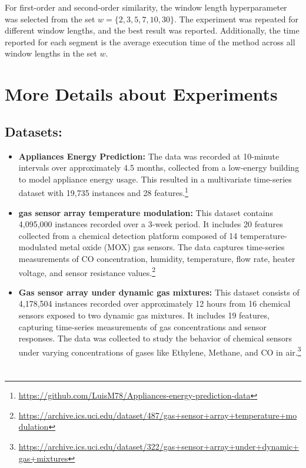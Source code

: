 \documentclass[twoside,11pt]{article}
\begin{document}
For first-order and second-order similarity, the window length hyperparameter was selected from the set \( w = \{2, 3, 5, 7, 10, 30\} \). The experiment was repeated for different window lengths, and the best result was reported. Additionally, the time reported for each segment is the average execution time of the method across all window lengths in the set \( w \).

\newpage

\appendix

\section{More Details about Experiments}
\subsection{Datasets:}
\begin{itemize}
	\item \textbf{Appliances Energy Prediction:} The data was recorded at 10-minute intervals over approximately 4.5 months, collected from a low-energy building to model appliance energy usage. This resulted in a multivariate time-series dataset with 19,735 instances and 28 features.\footnote{\url{https://github.com/LuisM78/Appliances-energy-prediction-data}}
\end{itemize}
\begin{itemize}
	\item \textbf{gas sensor array temperature modulation:} This dataset contains 4,095,000 instances recorded over a 3-week period. It includes 20 features collected from a chemical detection platform composed of 14 temperature-modulated metal oxide (MOX) gas sensors. The data captures time-series measurements of CO concentration, humidity, temperature, flow rate, heater voltage, and sensor resistance values.\footnote{\url{https://archive.ics.uci.edu/dataset/487/gas+sensor+array+temperature+modulation}}
	
\end{itemize}
\begin{itemize}
	\item \textbf{Gas sensor array under dynamic gas mixtures:} This dataset consists of 4,178,504 instances recorded over approximately 12 hours from 16 chemical sensors exposed to two dynamic gas mixtures. It includes 19 features, capturing time-series measurements of gas concentrations and sensor responses. The data was collected to study the behavior of chemical sensors under varying concentrations of gases like Ethylene, Methane, and CO in air.\footnote{\url{https://archive.ics.uci.edu/dataset/322/gas+sensor+array+under+dynamic+gas+mixtures}}
	
\end{itemize}







\section{}

\noindent



\vskip 0.2in

\end{document}
